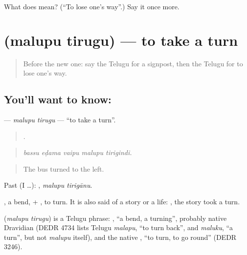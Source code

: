 \begin{tcolorbox}[breakable,colback=teal!4,colframe=teal!35!black,title={Before you move on}]
What does   mean? (\textquotedblleft{}To lose one's way\textquotedblright{}.) Say it once more.
\end{tcolorbox}
\section[\texorpdfstring{\te{మలుపు} \te{తిరుగు} (malupu tirugu)}{మలుపు తిరుగు (malupu tirugu)}]{  (malupu tirugu) — to take a turn}

\label{lesson:TE-C448-malupu-tirugu}



\begin{quote}
Before the new one: say the Telugu for a signpost, then the Telugu for to lose one's way.
\end{quote}

\subsection*{You'll want to know:  }
\textbf{ } — \emph{malupu tirugu} — \textquotedblleft{}to take a turn\textquotedblright{}.

\begin{quote}
    .
\end{quote}

\begin{quote}
\emph{bassu eḍama vaipu malupu tirigindi.}
\end{quote}

\begin{quote}
The bus turned to the left.
\end{quote}

Past (I …):  , \emph{malupu tirigānu}.

, a bend, + , to turn. It is also said of a story or a life:   , the story took a turn.

\begin{cousinweb}
\textbf{ } (\emph{malupu tirugu}) is a Telugu phrase: , \textquotedblleft{}a bend, a turning\textquotedblright{}, probably native Dravidian (DEDR 4734 lists Telugu \emph{malapu}, \textquotedblleft{}to turn back\textquotedblright{}, and \emph{maluku}, \textquotedblleft{}a turn\textquotedblright{}, but not \emph{malupu} itself), and the native , \textquotedblleft{}to turn, to go round\textquotedblright{} (DEDR 3246).
\end{cousinweb}

